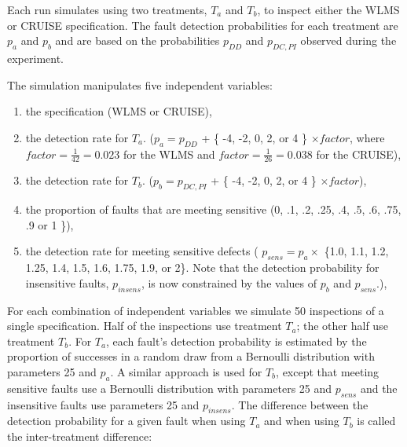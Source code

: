 
Each run simulates using two treatments, $T_a$ and $T_b$,
to inspect either the WLMS or CRUISE specification. 
The fault detection probabilities for each treatment 
are $p_a$ and $p_b$ and are based on the probabilities
$p_{DD}$ and $p_{DC,PI}$ observed during the experiment.   

The simulation manipulates five independent variables:

\begin{enumerate}

\item the specification (WLMS or CRUISE),

\item the detection rate for $T_a$. ($p_a = p_{DD}$ + \{ -4, -2, 0, 2, or 4 \}
$\times factor$, where $factor = \frac{1}{42} = 0.023 $ for the WLMS and 
$factor = \frac{1}{26} = 0.038$ for the CRUISE),

\item the detection rate for $T_b$. ($p_b = p_{DC,PI}$ + \{ -4, -2, 0, 2, or 4 \} 
$\times factor$), 

\item the proportion of faults that are meeting sensitive (0, .1, .2, .25, .4,
.5, .6, .75, .9 or 1 \}),

\item the detection rate for meeting sensitive defects ( $p_{sens} = p_a 
\times $ \{1.0, 1.1, 1.2, 1.25, 1.4, 1.5, 1.6, 1.75, 1.9, or 2\}. Note that 
the detection
probability for insensitive faults, $p_{insens}$, is now constrained by the 
values of $p_b$ and $p_{sens}$.),

\end{enumerate}

For each combination of independent variables we simulate 50 inspections of 
a single specification. Half of the inspections use treatment $T_a$; 
the other half use treatment $T_b$. 
For $T_a$, each fault's detection probability is estimated by 
the proportion of successes in a random draw from a Bernoulli 
distribution with parameters 25 and $p_a$. A similar approach is 
used for $T_b$, except that meeting sensitive faults 
use a Bernoulli distribution with parameters 25 and $p_{sens}$
and the insensitive faults use parameters  25 and $p_{insens}$.
The difference between the detection probability for a given fault
when using $T_a$ and when using $T_b$ is called the inter-treatment 
difference:

